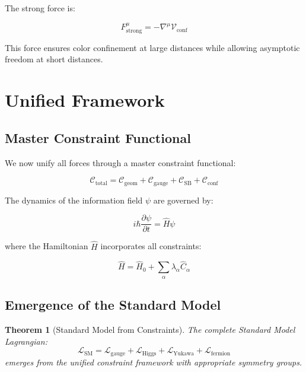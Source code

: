 \documentclass[11pt,a4paper]{article}
\newtheorem{theorem}{Theorem}
\begin{document}
The strong force is:

\begin{equation}
F_{\text{strong}}^{\mu} = -\nabla^{\mu} \mathcal{V}_{\text{conf}}
\end{equation}

This force ensures color confinement at large distances while allowing asymptotic freedom at short distances.

\section{Unified Framework}

\subsection{Master Constraint Functional}

We now unify all forces through a master constraint functional:

\begin{equation}
\mathcal{C}_{\text{total}} = \mathcal{C}_{\text{geom}} + \mathcal{C}_{\text{gauge}} + \mathcal{C}_{\text{SB}} + \mathcal{C}_{\text{conf}}
\end{equation}

The dynamics of the information field $\psi$ are governed by:

\begin{equation}
i\hbar \frac{\partial \psi}{\partial t} = \hat{H} \psi
\end{equation}

where the Hamiltonian $\hat{H}$ incorporates all constraints:

\begin{equation}
\hat{H} = \hat{H}_0 + \sum_{\alpha} \lambda_{\alpha} \hat{C}_{\alpha}
\end{equation}

\subsection{Emergence of the Standard Model}

\begin{theorem}[Standard Model from Constraints]
The complete Standard Model Lagrangian:
\begin{equation}
\mathcal{L}_{\text{SM}} = \mathcal{L}_{\text{gauge}} + \mathcal{L}_{\text{Higgs}} + \mathcal{L}_{\text{Yukawa}} + \mathcal{L}_{\text{fermion}}
\end{equation}
emerges from the unified constraint framework with appropriate symmetry groups.
\end{theorem}
\end{document}
